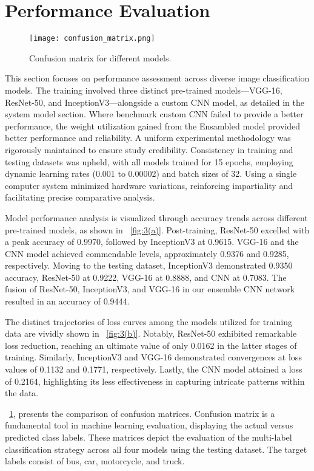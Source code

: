 \documentclass[10pt, conference, a4paper, compsocconf]{IEEEtran}
\begin{document}
\section{Performance Evaluation}
\begin{figure}[h!]
	\centering
	\texttt{[image: confusion\_matrix.png]}
	\caption{Confusion matrix for different models.}
	\label{fig:4}
\end{figure}
This section focuses on performance assessment across diverse image classification models. The training involved three distinct pre-trained models—VGG-16, ResNet-50, and InceptionV3—alongside a custom CNN model, as detailed in the system model section. Where benchmark custom CNN failed to provide a better performance, the weight utilization gained from the Ensambled model provided better performance and reliability. A uniform experimental methodology was rigorously maintained to ensure study credibility. Consistency in training and testing datasets was upheld, with all models trained for 15 epochs, employing dynamic learning rates (0.001 to 0.00002) and batch sizes of 32. Using a single computer system minimized hardware variations, reinforcing impartiality and facilitating precise comparative analysis.

\indent Model performance analysis is visualized through accuracy trends across different pre-trained models, as shown in \figurename\ \ref{fig:3(a)}. Post-training, ResNet-50 excelled with a peak accuracy of 0.9970, followed by InceptionV3 at 0.9615. VGG-16 and the CNN model achieved commendable levels, approximately 0.9376 and 0.9285, respectively. Moving to the testing dataset, InceptionV3 demonstrated 0.9350 accuracy, ResNet-50 at 0.9222, VGG-16 at 0.8888, and CNN at 0.7083. The fusion of ResNet-50, InceptionV3, and VGG-16 in our ensemble CNN network resulted in an accuracy of 0.9444.

\indent The distinct trajectories of loss curves among the models utilized for training data are vividly shown in \figurename\ \ref{fig:3(b)}. Notably, ResNet-50 exhibited remarkable loss reduction, reaching an ultimate value of only 0.0162 in the latter stages of training. Similarly, InceptionV3 and VGG-16 demonstrated convergences at loss values of 0.1132 and 0.1771, respectively. Lastly, the CNN model attained a loss of 0.2164, highlighting its less effectiveness in capturing intricate patterns within the data.

\indent \figurename\ \ref{fig:4}, presents the comparison of confusion matrices. Confusion matrix is a fundamental tool in machine learning evaluation, displaying the actual versus predicted class labels. These matrices depict the evaluation of the multi-label classification strategy across all four models using the testing dataset. The target labels consist of bus, car, motorcycle, and truck.
\end{document}
